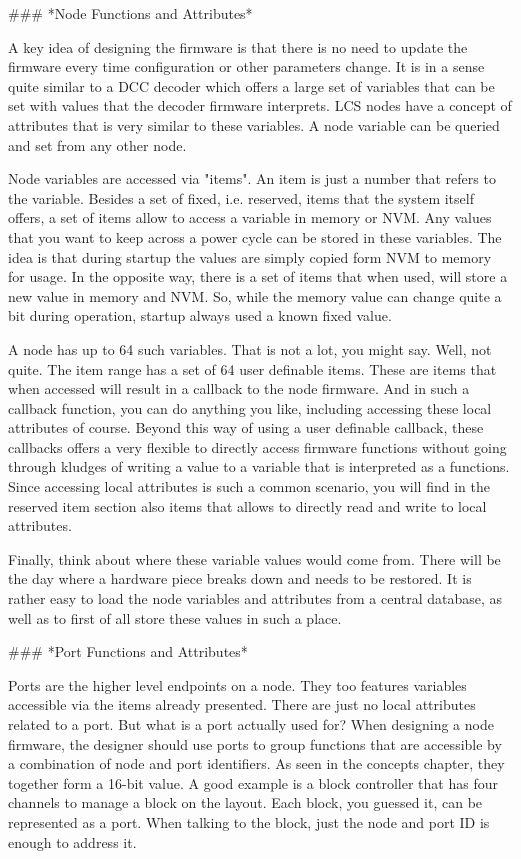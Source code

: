 ### *Node Functions and Attributes*

A key idea of designing the firmware is that there is no need to update the firmware every time configuration or other parameters change. It is in a sense quite similar to a DCC decoder which offers a large set of variables that can be set with values that the decoder firmware interprets. LCS nodes have a concept of attributes that is very similar to these variables. A node variable can be queried and set from any other node.

Node variables are accessed via "items". An item is just a number that refers to the variable. Besides a set of fixed, i.e. reserved, items that the system itself offers, a set of items allow to access a variable in memory or NVM. Any values that you want to keep across a power cycle can be stored in these variables. The idea is that during startup the values are simply copied form NVM to memory for usage. In the opposite way, there is a set of items that when used, will store a new value in memory and NVM. So, while the memory value can change quite a bit during operation, startup always used a known fixed value.

A node has up to 64 such variables. That is not a lot, you might say. Well, not quite. The item range has a set of 64 user definable items. These are items that when accessed will result in a callback to the node firmware. And in such a callback function, you can do anything you like, including accessing these local attributes of course. Beyond this way of using a user definable callback, these callbacks offers a very flexible to directly access firmware functions without going through kludges of writing a value to a variable that is interpreted as a functions. Since accessing local attributes is such a common scenario, you will find in the reserved item section also items that allows to directly read and write to local attributes.

Finally, think about where these variable values would come from. There will be the day where a hardware piece breaks down and needs to be restored. It is rather easy to load the node variables and attributes from a central database, as well as to first of all store these values in such a place.

### *Port Functions and Attributes*

Ports are the higher level endpoints on a node. They too features variables accessible via the items already presented. There are just no local attributes related to a port. But what is a port actually used for? When designing a node firmware, the designer should use ports to group functions that are accessible by a combination of node and port identifiers. As seen in the concepts chapter, they together form a 16-bit value. A good example is a block controller that has four channels to manage a block on the layout. Each block, you guessed it, can be represented as a port. When talking to the block, just the node and port ID is enough to address it.


